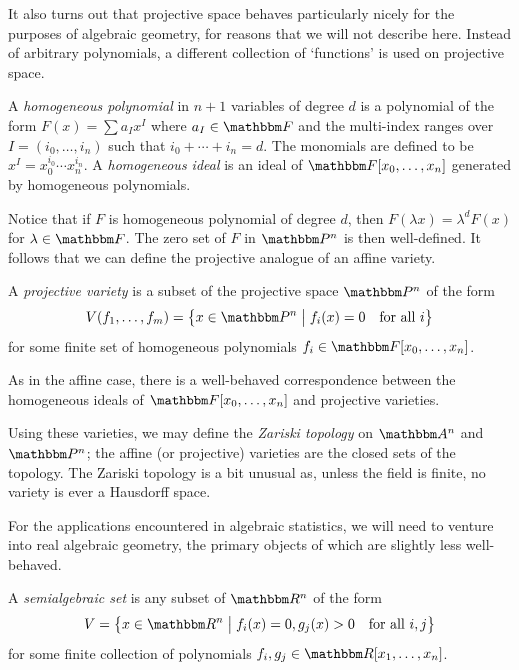 \documentclass[11pt,titlepage]{article}
\newcommand*{\vbar}{\;\big\vert\;}
\numberwithin{equation}{section}
\begin{document}
    It also turns out that projective space behaves particularly nicely for the
    purposes of algebraic geometry, for reasons that we will not describe here.
    Instead of arbitrary polynomials, a different collection of `functions' is
    used on projective space.
    \begin{definition}
        A \emph{homogeneous polynomial} in $n+1$ variables of degree $d$ is a
        polynomial of the form $F(x) = \sum a_I x^I$ where $a_I \in \F$ and the
        multi-index ranges over $I = (i_0, \ldots, i_n)$ such that $i_0 + \cdots
        + i_n = d$.  The monomials are defined to be $x^I = x_0^{i_0}\cdots
        x_n^{i_n}$.  A \emph{homogeneous ideal} is an ideal of $\F[x_0, \ldots,
        x_n]$ generated by homogeneous polynomials.
    \end{definition}
    Notice that if $F$ is homogeneous polynomial of degree $d$, then $F(\lambda
    x) = \lambda^d F(x)$ for $\lambda \in \F$.  The zero set of $F$ in $\Proj^n$
    is then well-defined.  It follows that we can define the projective analogue
    of an affine variety.
    \begin{definition}
        A \emph{projective variety} is a subset of the projective space
        $\Proj^n$ of the form
        \[
            V(f_1, \ldots, f_m)
            = \cdil[\big]{x \in \Proj^n \vbar f_i(x) = 0 \quad\text{for all $i$}}
        \]
        for some finite set of homogeneous polynomials $f_i \in \F[x_0,
        \ldots,x_n]$.
    \end{definition}
    As in the affine case, there is a well-behaved correspondence between the
    homogeneous ideals of $\F[x_0, \ldots, x_n]$ and projective varieties.

    Using these varieties, we may define the \emph{Zariski topology} on $\A^n$
    and $\Proj^n$;  the affine (or projective) varieties are the closed sets of
    the topology.  The Zariski topology is a bit unusual as, unless the field is
    finite, no variety is ever a Hausdorff space.

    For the applications encountered in algebraic statistics, we will need to
    venture into real algebraic geometry, the primary objects of which are
    slightly less well-behaved.
    \begin{definition}
        A \emph{semialgebraic set} is any subset of $\R^n$ of the form
        \[
            V = \cdil[\big]{ x \in \R^n \vbar
                f_i(x) = 0, g_j(x) > 0
            \quad\text{for all $i,j$}}
        \]
        for some finite collection of polynomials $f_i, g_j \in \R[x_1, \ldots,
        x_n]$.
    \end{definition}
\end{document}
